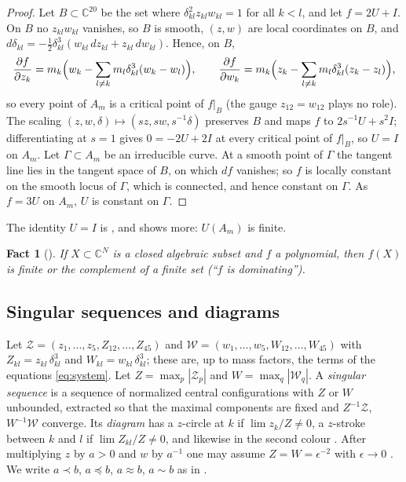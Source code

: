 \documentclass[11pt]{amsart}
\newtheorem{fact}{Fact}
\theoremstyle{definition}
\theoremstyle{remark}
\newcommand{\C}{\mathbb{C}}
\begin{document}
\begin{proof}
Let $B\subset\C^{20}$ be the set where $\delta_{kl}^2z_{kl}w_{kl}=1$ for all $k<l$, and let
$f=2U+I$.  On $B$ no $z_{kl}w_{kl}$ vanishes, so $B$ is smooth, $(z,w)$ are local coordinates
on $B$, and $d\delta_{kl}=-\frac12\delta_{kl}^3(w_{kl}\,dz_{kl}+z_{kl}\,dw_{kl})$.  Hence, on
$B$,
\[
  \frac{\partial f}{\partial z_k}=m_k\Bigl(w_k-\sum_{l\ne k}m_l\delta_{kl}^3(w_k-w_l)\Bigr),\qquad
  \frac{\partial f}{\partial w_k}=m_k\Bigl(z_k-\sum_{l\ne k}m_l\delta_{kl}^3(z_k-z_l)\Bigr),
\]
so every point of $A_m$ is a critical point of $f|_B$ (the gauge $z_{12}=w_{12}$ plays no
role).  The scaling $(z,w,\delta)\mapsto(sz,sw,s^{-1}\delta)$ preserves $B$ and maps $f$ to
$2s^{-1}U+s^2I$; differentiating at $s=1$ gives $0=-2U+2I$ at every critical point of $f|_B$, so
$U=I$ on $A_m$.  Let $\Gamma\subset A_m$ be an irreducible curve.  At a smooth point of
$\Gamma$ the tangent line lies in the tangent space of $B$, on which $df$ vanishes; so $f$ is
locally constant on the smooth locus of $\Gamma$, which is connected, and hence constant on
$\Gamma$.  As $f=3U$ on $A_m$, $U$ is constant on $\Gamma$.
\end{proof}
The identity $U=I$
is \cite[p.~541]{AK}, and \cite[Lemma~2]{AK} shows more: $U(A_m)$ is finite.

\begin{fact}[{\cite[Lemma~1]{AK}}]\label{fact:lemma1}
If $X\subset\C^N$ is a closed algebraic subset and $f$ a polynomial, then $f(X)$ is finite or
the complement of a finite set (``$f$ is dominating'').
\end{fact}

\subsection{Singular sequences and diagrams}
Let $\mathcal Z=(z_1,\dots,z_5,Z_{12},\dots,Z_{45})$ and $\mathcal W=(w_1,\dots,w_5,W_{12},
\dots,W_{45})$ with $Z_{kl}=z_{kl}\,\delta_{kl}^3$ and $W_{kl}=w_{kl}\,\delta_{kl}^3$; these are,
up to mass factors, the terms of the equations \eqref{eq:system}.  Let $Z=\max_p|\mathcal Z_p|$
and $W=\max_q|\mathcal W_q|$.  A \emph{singular sequence} \cite[Def.~3]{AK} is a sequence of
normalized central configurations with $Z$ or $W$ unbounded, extracted so that the maximal
components are fixed and $Z^{-1}\mathcal Z$, $W^{-1}\mathcal W$ converge.  Its \emph{diagram}
has a $z$-circle at $k$ if $\lim z_k/Z\ne0$, a $z$-stroke between $k$ and $l$ if
$\lim Z_{kl}/Z\ne 0$, and likewise in the second colour \cite[\S3]{AK}.  After multiplying $z$
by $a>0$ and $w$ by $a^{-1}$ one may assume $Z=W=\epsilon^{-2}$ with $\epsilon\to0$
\cite[p.~547]{AK}.  We write $a\prec b$, $a\preccurlyeq b$, $a\approx b$, $a\sim b$ as in
\cite[\S3]{AK}.
\end{document}

